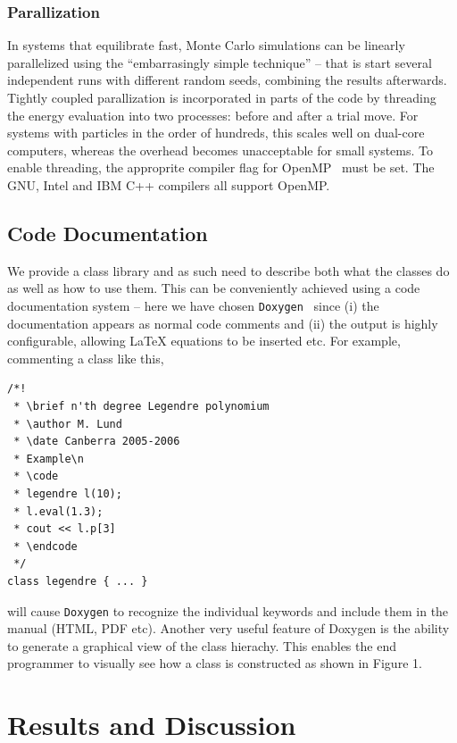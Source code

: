 \documentclass[10pt]{bmc_article}
\newenvironment{bmcformat}{\fussy\setboolean{publ}{true}}{\fussy}
\begin{document}
\begin{bmcformat}
\subsubsection*{Parallization}
In systems that equilibrate fast, Monte Carlo simulations can be linearly parallelized using the ``embarrasingly simple technique'' -- that is start several independent runs with different random seeds, combining the results afterwards.
Tightly coupled parallization is incorporated in parts of the code by threading the energy evaluation into two processes: before and after a trial move.
For systems with particles in the order of hundreds, this scales well on dual-core computers, whereas the overhead becomes unacceptable for small systems. To enable threading, the approprite compiler flag for OpenMP~\cite{openmp:98} must be set. The GNU, Intel and IBM C++ compilers all support OpenMP.

\subsection*{Code Documentation}
We provide a class library and as such need to describe both what the classes do as well as how to use them. This can be conveniently achieved using a code documentation system -- here we have chosen \verb"Doxygen"~\cite{doxygen} since (i) the documentation appears as normal code comments and (ii) the output is highly configurable, allowing LaTeX equations to be inserted etc.
For example, commenting a class like this,
\begin{verbatim}
/*!
 * \brief n'th degree Legendre polynomium
 * \author M. Lund
 * \date Canberra 2005-2006
 * Example\n
 * \code
 * legendre l(10);
 * l.eval(1.3);
 * cout << l.p[3]
 * \endcode
 */
class legendre { ... }
\end{verbatim}
will cause \verb"Doxygen" to recognize the individual keywords and include them in the manual (HTML, PDF etc).
Another very useful feature of Doxygen is the ability to generate a graphical view of the class hierachy. This enables the end programmer to visually see how a class is constructed as shown in Figure 1.



 
\section*{Results and Discussion}


\end{bmcformat}
\end{document}
